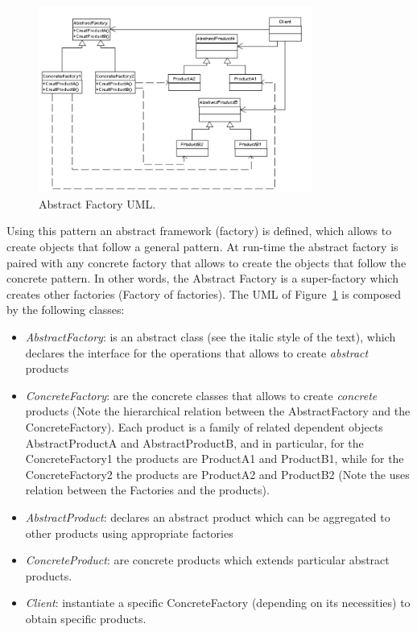 \documentclass{article}
\begin{document}
\begin{figure}[h!]
  \centering
    \includegraphics[width=0.8\textwidth]{Img/AbstractFactoryUML.png}
     \caption{Abstract Factory UML.}
     \label{AbstractFactoryUML}
\end{figure}

Using this pattern an abstract framework (factory) is defined, which allows to create objects that follow a general pattern. At run-time the abstract factory is paired with any concrete factory that allows to create the objects that follow the concrete pattern. In other words, the Abstract Factory is a super-factory which creates other factories (Factory of factories). The UML of Figure~\ref{AbstractFactoryUML} is composed by the following classes:
\begin{itemize}
\item \emph{AbstractFactory}: is an abstract class (see the italic style of the text), which declares the interface for the operations that allows to create \emph{abstract} products
\item \emph{ConcreteFactory}: are the concrete classes that allows to create \emph{concrete} products (Note the hierarchical relation between the AbstractFactory and the ConcreteFactory). Each product is a family of related dependent objects AbstractProductA and AbstractProductB, and in particular, for the ConcreteFactory1 the products are ProductA1 and ProductB1, while for the ConcreteFactory2 the products are ProductA2 and ProductB2 (Note the uses relation between the Factories and the products).
\item \emph{AbstractProduct}:  declares an abstract product which can be aggregated to other products using appropriate factories
\item \emph{ConcreteProduct}: are  concrete products which extends  particular abstract products.
\item \emph{Client}: instantiate a specific ConcreteFactory (depending on its necessities) to obtain specific products.
\end{itemize}
\end{document}
